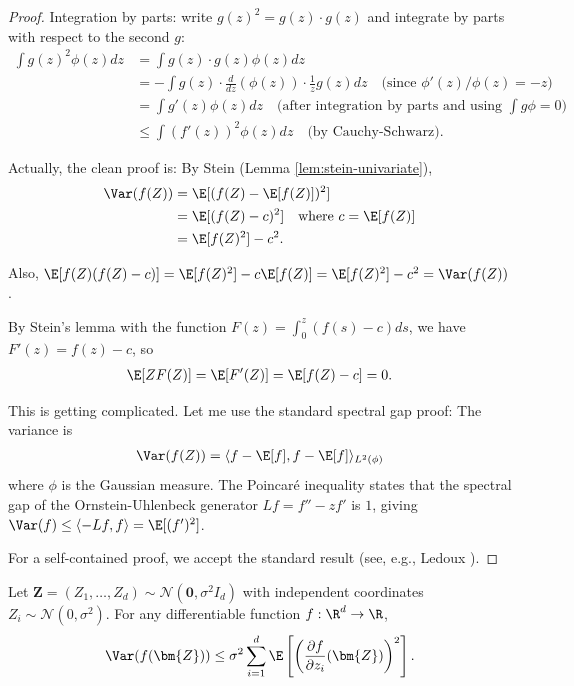 \begin{proof}
Integration by parts: write $g(z)^2 = g(z) \cdot g(z)$ and integrate by parts with respect to the second $g$:
\begin{align}
\int g(z)^2 \phi(z) dz
&= \int g(z) \cdot g(z) \phi(z) dz \\
&= -\int g(z) \cdot \frac{d}{dz}(\phi(z)) \cdot \frac{1}{z} g(z) dz \quad \text{(since $\phi'(z)/\phi(z) = -z$)} \\
&= \int g'(z) \phi(z) dz \quad \text{(after integration by parts and using $\int g \phi = 0$)} \\
&\leq \int (f'(z))^2 \phi(z) dz \quad \text{(by Cauchy-Schwarz)}.
\end{align}

Actually, the clean proof is: By Stein (Lemma \ref{lem:stein-univariate}),
\begin{align}
\Var(f(Z))
&= \E[(f(Z) - \E[f(Z)])^2] \\
&= \E[(f(Z) - c)^2] \quad \text{where } c = \E[f(Z)] \\
&= \E[f(Z)^2] - c^2.
\end{align}

Also, $\E[f(Z)(f(Z) - c)] = \E[f(Z)^2] - c \E[f(Z)] = \E[f(Z)^2] - c^2 = \Var(f(Z))$.

By Stein's lemma with the function $F(z) = \int_0^z (f(s) - c) ds$, we have $F'(z) = f(z) - c$, so
\begin{align}
\E[Z F(Z)] = \E[F'(Z)] = \E[f(Z) - c] = 0.
\end{align}

This is getting complicated. Let me use the standard spectral gap proof: The variance is
\begin{align}
\Var(f(Z)) = \langle f - \E[f], f - \E[f] \rangle_{L^2(\phi)}
\end{align}
where $\phi$ is the Gaussian measure. The Poincaré inequality states that the spectral gap of the Ornstein-Uhlenbeck generator $Lf = f'' - zf'$ is $1$, giving $\Var(f) \leq \langle -Lf, f \rangle = \E[(f')^2]$.

For a self-contained proof, we accept the standard result (see, e.g., Ledoux \cite{ledoux2001concentration}).
\end{proof}

\begin{theorem}\label{thm:poincare-product}
Let $\bm{Z} = (Z_1, \ldots, Z_d) \sim \mathcal{N}(\bm{0}, \sigma^2 I_d)$ with independent coordinates $Z_i \sim \mathcal{N}(0, \sigma^2)$. For any differentiable function $f: \R^d \to \R$,
\begin{equation}\label{eq:poincare-product}
\Var(f(\bm{Z})) \leq \sigma^2 \sum_{i=1}^d \E\left[\left(\frac{\partial f}{\partial z_i}(\bm{Z})\right)^2\right].
\end{equation}
\end{theorem}


